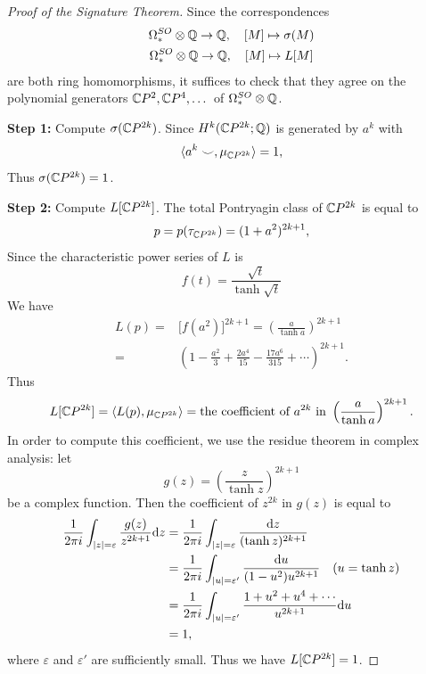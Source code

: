 \begin{proof}[Proof of the Signature Theorem]
    Since the correspondences
    \begin{gather*}
        \Omega_*^{SO} \otimes \mathbb{Q} \to \mathbb{Q}, \quad [M] \mapsto \sigma(M) \\
        \Omega_*^{SO} \otimes \mathbb{Q} \to \mathbb{Q}, \quad [M] \mapsto L[M]
    \end{gather*}
    are both ring homomorphisms, it suffices to check that they agree on the polynomial generators 
    $\mathbb{C} P^{2}, \mathbb{C} P^{4}, \dots$ of $\Omega_*^{SO} \otimes \mathbb{Q}$.

    \noindent \textbf{Step 1:} Compute $\sigma(\mathbb{C} P^{2k})$.
    Since $H^k(\mathbb{C} P^{2k};\mathbb{Q})$ is generated by $a^k$ with 
    \begin{equation*}
        \langle a^k\smile, \mu_{\mathbb{C} P^{2k}} \rangle = 1,
    \end{equation*} 
    Thus $\sigma(\mathbb{C} P^{2k}) = 1$. 

    \noindent \textbf{Step 2:} Compute $L[\mathbb{C} P^{2k}]$.
    The total Pontryagin class of $\mathbb{C} P^{2k}$ is equal to
    \begin{equation*}
        p = p(\tau_{\mathbb{C} P^{2k}}) = (1 + a^2)^{2k+1},
    \end{equation*}
    Since the characteristic power series of $L$ is
    \begin{equation*}
        f(t) = \frac{\sqrt{t}}{\tanh \sqrt{t}} 
    \end{equation*}
    We have
    \begin{align*}
        L(p) =& \big[f(a^2)\big]^{2k+1} = \left(\frac{a}{\tanh a}\right)^{2k+1} \\
        =& \left(1 - \frac{a^2}{3} + \frac{2 a^4}{15} - \frac{17 a^6}{315} + \cdots\right)^{2k+1}.
    \end{align*}
    Thus 
    \begin{equation*}
        L[\mathbb{C} P^{2k}] = \langle L(p), \mu_{\mathbb{C} P^{2k}} \rangle = \text{the coefficient of } a^{2k} \text{ in } \left(\frac{a}{\tanh a}\right)^{2k+1}.
    \end{equation*}
    In order to compute this coefficient, we use the residue theorem in complex analysis: let 
    \begin{equation*}
        g(z) = \left(\frac{z}{\tanh z}\right)^{2k+1}
    \end{equation*}
    be a complex function. Then the coefficient of $z^{2k}$ in $g(z)$ is equal to
    \begin{align*}
        \frac{1}{2\pi i}\int_{|z|=\varepsilon} \frac{g(z)}{z^{2k+1}} {\rm d} z &= \frac{1}{2\pi i}\int_{|z|=\varepsilon} \frac{{\rm d} z}{(\tanh z)^{2k+1}}  \\
        &= \frac{1}{2\pi i}\int_{|u|=\varepsilon'} \frac{{\rm d} u}{(1-u^2)u^{2k+1}} \quad (u = \tanh z) \\ 
        &= \frac{1}{2\pi i}\int_{|u|=\varepsilon'} \frac{1+u^2+u^4+\cdots}{u^{2k+1}} {\rm d} u \\
        &= 1,
    \end{align*}
    where $\varepsilon$ and $\varepsilon'$ are sufficiently small. Thus we have $L[\mathbb{C} P^{2k}] = 1$.
\end{proof}
